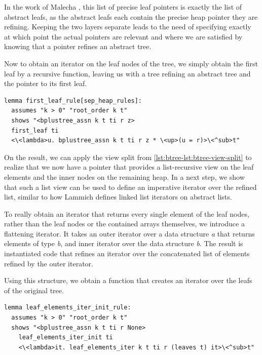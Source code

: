 \documentclass[a4paper,UKenglish,cleveref, autoref, thm-restate]{lipics-v2021}
\begin{document}
In the work of Malecha \cite{DBLP:conf/popl/MalechaMSW10}, 
this list of precise leaf pointers is exactly the list of abstract leafs,
as the abstract leafs each contain the precise heap pointer they are refining.
Keeping the two layers separate leads to the need of specifying
exactly at which point the actual pointers are relevant
and where we are satisfied by knowing that a pointer refines
an abstract tree.

Now to obtain an iterator on the leaf nodes of the tree,
we simply obtain the first leaf by a recursive function, leaving
us with a tree refining an abstract tree and the pointer to its first leaf.

\begin{lstlisting}[mathescape=true, language=Isabelle,label=lst:btree-first-leaf]
lemma first_leaf_rule[sep_heap_rules]:
  assumes "k > 0" "root_order k t"
  shows "<bplustree_assn k t ti r z>
  first_leaf ti
  <\<lambda>u. bplustree_assn k t ti r z * \<up>(u = r)>\<^sub>t"
\end{lstlisting}


On the result, we can apply the view split from \autoref{lst:btree-lst:btree-view-split}
to realize that we now have a pointer that provides a list-recursive
view on the leaf elements and the inner nodes on the remaining heap.
In a next step, we show that such a list view can be used
to define an imperative iterator over the refined list,
similar to how Lammich defines linked list iterators on abstract lists.

To really obtain an iterator that returns every single element of the
leaf nodes, rather than the leaf nodes or the contained arrays themselves,
we introduce a flattening iterator.
It takes an outer iterator over a data structure \textit{a} that returns elements of type \textit{b},
and inner iterator over the data structure \textit{b}.
The result is instantiated code that refines an iterator
over the concatenated list of elements refined by the outer iterator.

Using this structure, we obtain a function that creates an iterator
over the leafs of the original tree.
\begin{lstlisting}[mathescape=true, language=Isabelle,label=lst:btree-view-split]
lemma leaf_elements_iter_init_rule:
  assumes "k > 0" "root_order k t"
  shows "<bplustree_assn k t ti r None>
    leaf_elements_iter_init ti
    <\<lambda>it. leaf_elements_iter k t ti r (leaves t) it>\<^sub>t"
\end{lstlisting}
\end{document}
